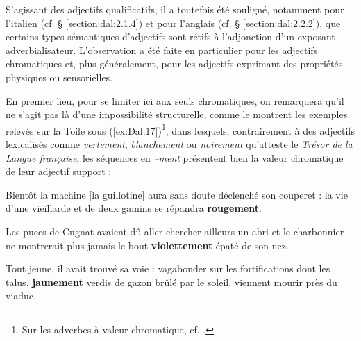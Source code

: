 \documentclass[output=paper]{langsci/langscibook}
\begin{document}
S'agissant des adjectifs qualificatifs, il a toutefois été souligné, notamment pour l'italien (cf. § \ref{section:dal:2.1.4}) et pour l'anglais (cf. § \ref{section:dal:2.2.2}), que certains types sémantiques d'adjectifs sont rétifs à l'adjonction d'un exposant adverbialisateur. L'observation a été faite en particulier pour les adjectifs chromatiques et, plus généralement, pour les adjectifs exprimant des propriétés physiques ou sensorielles.

En premier lieu, pour se limiter ici aux seuls chromatiques, on remarquera qu'il ne s'agit pas là d'une impossibilité structurelle, comme le montrent les exemples relevés sur la Toile sous (\ref{ex:Dal:17})\footnote{Sur les adverbes à valeur chromatique, cf. %
\citet{Mora-Millan05}%
%
.}, dans lesquels, contrairement à des adjectifs lexicalisés comme \emph{vertement}, \emph{blanchement} ou \emph{noirement} qu'atteste le \emph{Trésor de la Langue française}, les séquences en \emph{--ment} présentent bien la valeur chromatique de leur adjectif support :


\ea\label{ex:Dal:17}
    \ea Bientôt la machine {[}la guillotine{]} aura sans doute déclenché son couperet : la vie d'une vieillarde et de deux gamins se répandra \textbf{rougement}.

    \ex Les puces de Cugnat avaient dû aller chercher ailleurs un abri et le charbonnier ne montrerait plus jamais le bout \textbf{violettement} épaté de son nez.

    \ex Tout jeune, il avait trouvé sa voie : vagabonder sur les fortifications dont les talus, \textbf{jaunement} verdis de gazon brûlé par le soleil, viennent mourir près du viaduc.
\z\z
\end{document}
